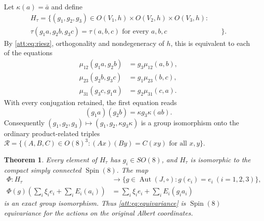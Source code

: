 \documentclass[11pt]{article}
\newtheorem{theorem}{Theorem}[section]
\theoremstyle{definition}
\begin{document}
Let $\kappa(a)=\bar a$ and define
\begin{equation}
\begin{split}
H_\tau=\{(g_1,g_2,g_3)\in O(V_1,h)\times O(V_2,h)\times O(V_3,h):\quad&\\
\tau(g_1a,g_2b,g_3c)=\tau(a,b,c)\text{ for every }a,b,c&\}.
\end{split}
\label{att:eq:metric-stabilizer}
\end{equation}
By \eqref{att:eq:riesz}, orthogonality and nondegeneracy of $h$,
this is equivalent to each of the equations
\begin{align}
 \mu_{12}(g_1a,g_2b)&=g_3\mu_{12}(a,b),\nonumber\\
 \mu_{23}(g_2b,g_3c)&=g_1\mu_{23}(b,c),\label{att:eq:equivariance}\\
 \mu_{31}(g_3c,g_1a)&=g_2\mu_{31}(c,a).\nonumber
\end{align}
With every conjugation retained, the first equation reads
\begin{equation}
 (g_1a)(g_2b)=\kappa g_3\kappa(ab).
 \label{att:eq:related-triple}
\end{equation}
Consequently $(g_1,g_2,g_3)\mapsto(g_1,g_2,\kappa g_3\kappa)$
is a group isomorphism onto the ordinary product-related triples
$\mathcal R=\{(A,B,C)\in O(8)^3:(Ax)(By)=C(xy)\text{ for all }x,y\}$.

\begin{theorem}\label{att:thm:stabilizer}
Every element of $H_\tau$ has $g_i\in SO(8)$, and $H_\tau$ is
isomorphic to the compact simply connected $\operatorname{Spin}(8)$.
The map
\[
\begin{split}
 \Phi:H_\tau&\longrightarrow
 \{g\in\operatorname{Aut}(J,\circ):g(e_i)=e_i\ (i=1,2,3)\},\\
 \Phi(g)\left(\sum_i\xi_i e_i+\sum_iE_i(a_i)\right)
 &=\sum_i\xi_i e_i+\sum_iE_i(g_i a_i)
\end{split}
\]
is an exact group isomorphism. Thus \eqref{att:eq:equivariance} is
$\operatorname{Spin}(8)$ equivariance for the actions on the original
Albert coordinates.
\end{theorem}
\end{document}
